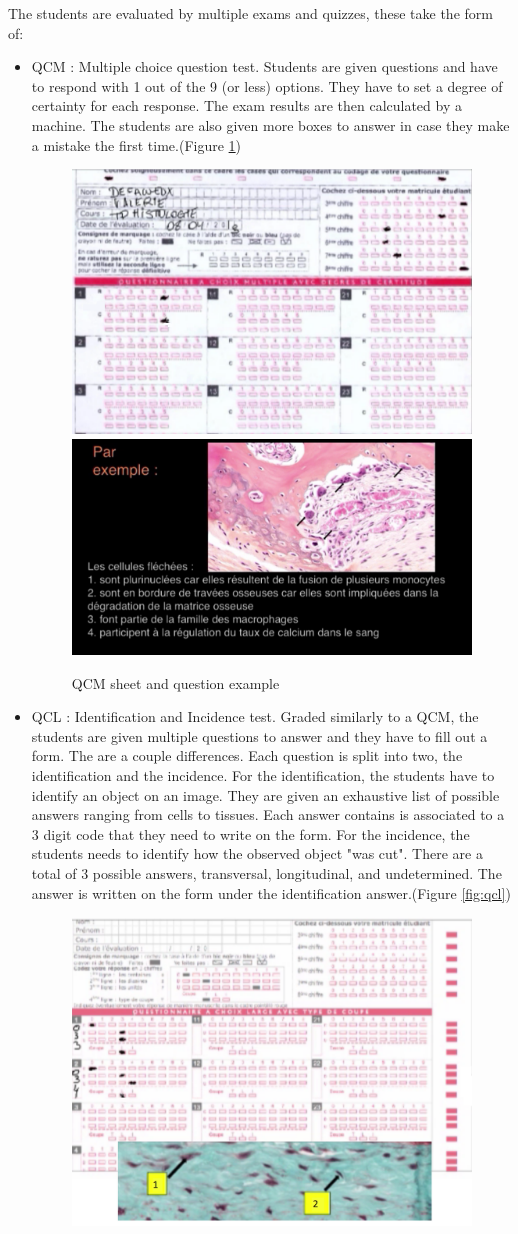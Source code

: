 \documentclass[a4paper,11pt]{report}
\numberwithin{figure}{section} %
\begin{document}
	The students are evaluated by multiple exams and quizzes, these take the form of:
    \begin{itemize}
    \item[\textbullet]  QCM : Multiple choice question test.
    Students are given questions and have to respond with 1 out of the 9 (or less) options.
    They have to set a degree of certainty for each response.
    The exam results are then calculated by a machine.
    The students are also given more boxes to answer in case they make a mistake the first time.(Figure \ref{fig:qcm})
    \begin{figure}[H]
    \centering
     \includegraphics[width=0.4\linewidth]{exam_qcm.png}
     \includegraphics[width=0.5\linewidth]{exam_qcm2.png}
     \caption{QCM sheet and question example}
     \label{fig:qcm}
    \end{figure}
	\item[\textbullet]  QCL : Identification and Incidence test.
	Graded similarly to a QCM, the students are given multiple questions to answer and they have to fill out a form.
	The are a couple differences.
	Each question is split into two, the identification and the incidence.
	For the identification, the students have to identify an object on an image.
	They are given an exhaustive list of possible answers ranging from cells to tissues.
	Each answer contains is associated to a 3 digit code that they need to write on the form.
	For the incidence, the students needs to identify how the observed object "was cut".
	There are a total of 3 possible answers, transversal, longitudinal, and undetermined.
	The answer is written on the form under the identification answer.(Figure \ref{fig:qcl})
      \begin{figure}[H]
    \centering
     \includegraphics[width=0.42\linewidth]{exam_qcl2.png}

\end{figure}
\end{itemize}
\end{document}
